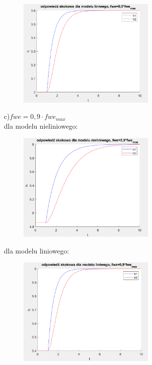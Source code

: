 \documentclass{article}
\begin{document}
\begin{figure}[h!]
    \centering
    \includegraphics[width=0.6\textwidth]{skokL05.png}
    \label{fig:my_label}
\end{figure}
\begin{flushleft}
c)$fwe=0,9 \cdot fwe_{max}$ \\
dla modelu nieliniowego:
\end{flushleft}


 \begin{figure}[h!]
    \centering
    \includegraphics[width=0.6\textwidth]{skokNL09.png}
    \label{fig:my_label}
\end{figure}
\newpage
\begin{flushleft}
dla modelu liniowego:
\end{flushleft}

\begin{figure}[h!]
    \centering
    \includegraphics[width=0.6\textwidth]{skokL09.png}
    \label{fig:my_label}
\end{figure}
\end{document}
